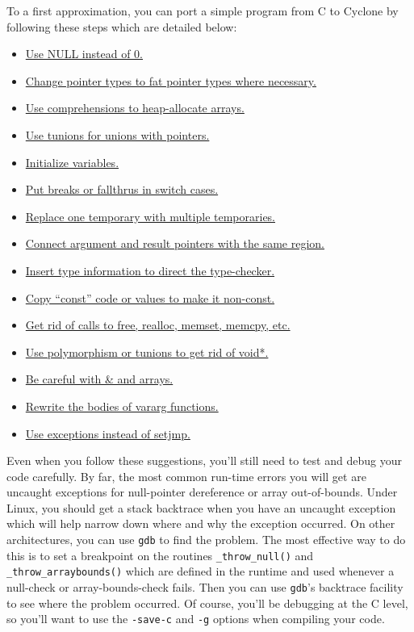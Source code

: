 To a first approximation, you can port a simple program
from C to Cyclone by following these steps which are
detailed below:
\begin{itemize}
\item \hyperlink{port:null}{Use NULL instead of 0.}
\item \hyperlink{port:pointers}{Change pointer types to fat pointer types where necessary.}  
\item \hyperlink{port:malloc}{Use comprehensions to heap-allocate arrays.}
\item \hyperlink{port:unions}{Use tunions for unions with pointers.}
\item \hyperlink{port:initialize}{Initialize variables.}  
\item \hyperlink{port:cases}{Put breaks or fallthrus in switch cases.} 
\item \hyperlink{port:temp}{Replace one temporary with multiple temporaries.}  
\item \hyperlink{port:rgns}{Connect argument and result pointers with the same region.}
\item \hyperlink{port:types}{Insert type information to direct the type-checker.}
\item \hyperlink{port:const}{Copy ``const'' code or values to make it non-const.}  
\item \hyperlink{port:free}{Get rid of calls to free, realloc, memset, memcpy, etc.}
\item \hyperlink{port:poly}{Use polymorphism or tunions to get rid of void*.}  
\item \hyperlink{port:arrays}{Be careful with \& and arrays.}
\item \hyperlink{port:vararg}{Rewrite the bodies of vararg functions.}
\item \hyperlink{port:setjmp}{Use exceptions instead of setjmp.}
\end{itemize}

Even when you follow these suggestions, you'll still need to test and
debug your code carefully.  By far, the most common run-time errors
you will get are uncaught exceptions for null-pointer dereference
or array out-of-bounds.  Under Linux, you should get a stack backtrace
when you have an uncaught exception which will help narrow down
where and why the exception occurred.  On other architectures, you
can use \texttt{gdb} to find the problem.  The most effective way
to do this is to set a breakpoint on the routines \texttt{\_throw\_null()}
and \texttt{\_throw\_arraybounds()} which are defined in the
runtime and used whenever a null-check or array-bounds-check fails.
Then you can use \texttt{gdb}'s backtrace facility to see where
the problem occurred.  Of course, you'll be debugging at the C
level, so you'll want to use the \texttt{-save-c} and \texttt{-g}
options when compiling your code.  


